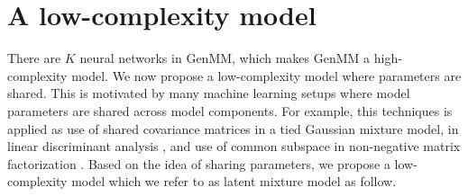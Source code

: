 






\section{A low-complexity model}
There are $K$ neural networks in GenMM, which makes GenMM a high-complexity model.
We now propose a low-complexity model where parameters are shared. This is motivated by many machine learning setups where model parameters are shared across model components. For example, this techniques is applied as use of shared covariance matrices in a tied Gaussian mixture model, in linear discriminant analysis \cite{bellegarda1990tiedmixture, Kimball:1993:UTD:1075671.1075694, Bishop:2006:PRM:1162264}, and use of common subspace in non-negative matrix factorization \cite{Gupta2013}. Based on the idea of sharing parameters, we propose a low-complexity model which we refer to as latent mixture model as follow.

